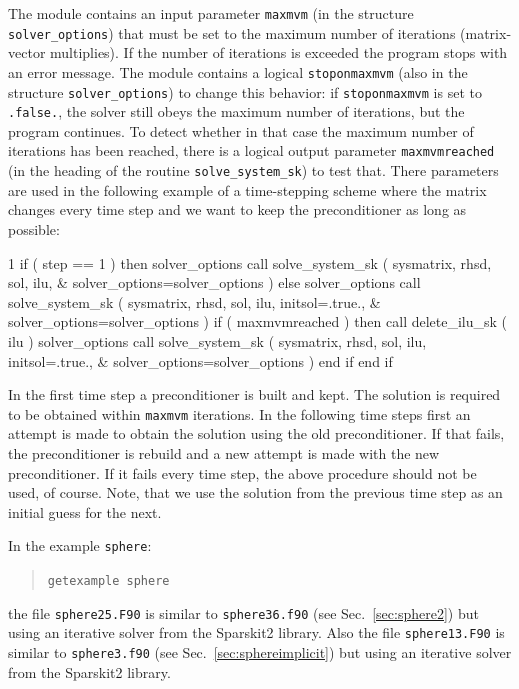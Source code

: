 The module contains an input parameter \texttt{maxmvm} (in
the structure \texttt{solver\_options}) that must be set to the
maximum number of iterations (matrix-vector multiplies). If the number of
iterations is exceeded the program stops with an error message. The module
contains a logical \texttt{stoponmaxmvm} (also in
the structure \texttt{solver\_options}) to change this behavior: if
\texttt{stoponmaxmvm} is set to \texttt{.false.}, the solver still obeys the
maximum number of iterations, but the program continues. To detect whether in
that case the maximum number of iterations has been reached, there is a logical
output parameter \texttt{maxmvmreached} (in the heading of
the routine \texttt{solve\_system\_sk}) to test that. There parameters
are used in the following example of a
time-stepping scheme where the matrix changes every time step and we want to
keep the preconditioner as long as possible:
\begin{listing}{1}
  if ( step == 1 ) then
    solver_options%
    call solve_system_sk ( sysmatrix, rhsd, sol, ilu, &
      solver_options=solver_options )
  else
    solver_options%
    call solve_system_sk ( sysmatrix, rhsd, sol, ilu, initsol=.true., &
      solver_options=solver_options )
    if ( maxmvmreached ) then
      call delete_ilu_sk ( ilu )
      solver_options%
      call solve_system_sk ( sysmatrix, rhsd, sol, ilu, initsol=.true., &
        solver_options=solver_options )
    end if
  end if
\end{listing}
In the first time step a preconditioner is built and kept. The solution is
required to be obtained within \texttt{maxmvm} iterations. In the following time
steps first an attempt is made to obtain the solution using the
old preconditioner. If that fails, the preconditioner is rebuild and a new
attempt is made with the new preconditioner. If it fails every time step, the
above procedure should not be used, of course. Note, that we use the solution
from the previous time step as an initial guess for the next.

In the example \texttt{sphere}:
\begin{quote}
   \texttt{getexample sphere}
\end{quote}
the file \texttt{sphere25.F90} is similar to \texttt{sphere36.f90} (see
Sec.~\ref{sec:sphere2}) but using an iterative solver from the Sparskit2
library.
Also
the file \texttt{sphere13.F90} is similar to \texttt{sphere3.f90} (see
Sec.~\ref{sec:sphereimplicit}) but using an iterative solver from the Sparskit2
library.


